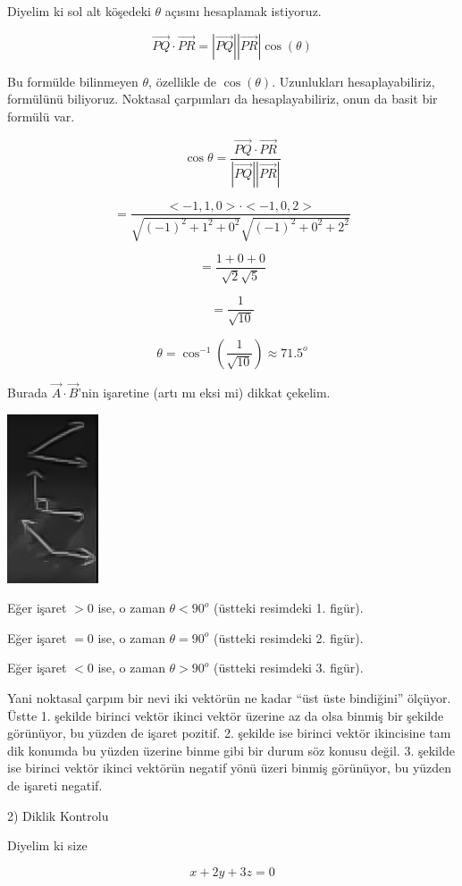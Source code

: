 \documentclass[12pt,fleqn]{article}\usepackage{../../common}
\begin{document}
Diyelim ki sol alt köşedeki $\theta$ açısını hesaplamak istiyoruz. 

$$ \vec{PQ} \cdot \vec{PR} = |\vec{PQ}||\vec{PR}|\cos(\theta)  $$

Bu formülde bilinmeyen $\theta$, özellikle de $\cos(\theta)$. Uzunlukları
hesaplayabiliriz, formülünü biliyoruz. Noktasal çarpımları da hesaplayabiliriz,
onun da basit bir formülü var.

$$ \cos\theta = \frac{\vec{PQ} \cdot \vec{PR}}{|\vec{PQ}||\vec{PR}|}$$

$$ = \frac{<-1,1,0>\cdot<-1,0,2>}
{  \sqrt{(-1)^2+1^2+0^2 }\sqrt{(-1)^2+0^2+2^2 }   } 
$$

$$ = \frac{1+0+0}{\sqrt{2}\sqrt{5}}  $$

$$ = \frac{1}{\sqrt{10}} $$

$$ \theta = \cos^{-1}(\frac{1}{\sqrt{10}}) \approx 71.5^o $$

Burada $\vec{A}\cdot\vec{B}$'nin işaretine (artı mı eksi mi) dikkat
çekelim. 

\includegraphics[height=5cm]{1_13.png}

Eğer işaret $>0$ ise, o zaman $\theta < 90^o$ (üstteki resimdeki
1. figür). 

Eğer işaret $=0$ ise, o zaman $\theta = 90^o$ (üstteki resimdeki
2. figür). 

Eğer işaret $<0$ ise, o zaman $\theta > 90^o$ (üstteki resimdeki
3. figür). 

Yani noktasal çarpım bir nevi iki vektörün ne kadar ``üst üste bindiğini''
ölçüyor. Üstte 1. şekilde birinci vektör ikinci vektör üzerine az da olsa binmiş 
bir şekilde görünüyor, bu yüzden de işaret pozitif. 2. şekilde ise birinci 
vektör ikincisine tam dik konumda bu yüzden üzerine binme gibi bir durum söz 
konusu değil. 3. şekilde ise birinci vektör ikinci vektörün negatif yönü üzeri 
binmiş görünüyor, bu yüzden de işareti negatif. 

2) Diklik Kontrolu

Diyelim ki size 

$$ x + 2y + 3z = 0 $$
\end{document}
